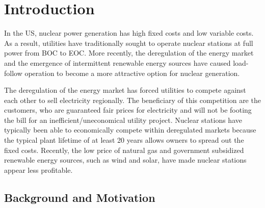 \documentclass[edeposit,fullpage,11pt]{uiucthesis2009}
\begin{document}

\mainmatter

\chapter{Introduction}

In the \gls{US}, nuclear power generation has high fixed costs and low variable costs. 
As a result, utilities have traditionally sought to operate nuclear stations at full power from \gls{BOC} to \gls{EOC}. 
More recently, the deregulation of the energy market and the emergence of intermittent renewable energy sources have caused load-follow operation to become a more attractive option for nuclear generation. 

The deregulation of the energy market has forced utilities to compete against each other to sell electricity regionally.
The beneficiary of this competition are the customers, who are guaranteed fair prices for electricity and will not be footing the bill for an inefficient/uneconomical utility project. %
Nuclear stations have typically been able to economically compete within deregulated markets because the typical plant lifetime of at least 20 years allows owners to spread out the fixed costs.
Recently, the low price of natural gas and government subsidized renewable energy sources, such as wind and solar, have made nuclear stations appear less profitable.   

\section{Background and Motivation}
\end{document}
